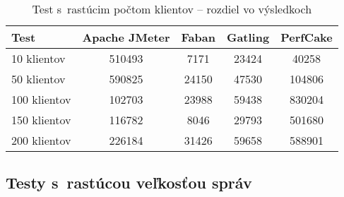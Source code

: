 \documentclass[12pt,oneside,final]{fithesis-utf8}
\begin{document}
\begin{itemize}
\begin{table}[H]
\begin{center}
\begin{tabular}{ | l | c | c | c | c |}
		\hline
		 \textbf{Test} & \textbf{Apache JMeter} & \textbf{Faban} & \textbf{Gatling} & \textbf{PerfCake} \\ \hline
		 10 klientov & 510493 & 7171 & 23424 & 40258 \\ \hline
		 50 klientov & 590825 & 24150 & 47530 & 104806 \\ \hline
		 100 klientov & 102703 & 23988 & 59438 & 830204 \\ \hline
		 150 klientov & 116782 & 8046 & 29793 & 501680 \\ \hline
		 200 klientov & 226184 & 31426 & 59658 & 588901 \\ \hline
		 
\end{tabular}
\end{center}
\caption{Test s~rastúcim počtom klientov -- rozdiel vo výsledkoch}
\end{table}

\end{itemize}

\subsection{Testy s~rastúcou veľkosťou správ}
\end{document}
